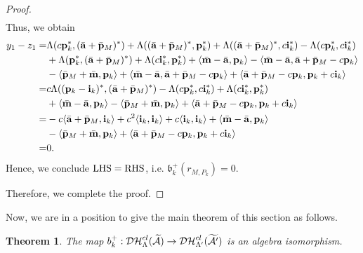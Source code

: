 \documentclass[reqno,12pt]{amsart}
\numberwithin{equation}{section}
\def\lr#1{\langle #1\rangle} \def\fin{\hfill$\square$}  \def\lra{\longrightarrow} \def\mod{\mbox{\rm \textbf{mod}}\,}\def\Mod{\mbox{\rm mod}\,}\def\top{\mbox{\rm top}\,}\def\soc{\mbox{\rm soc}\,}
\theoremstyle{plain} %
\newtheorem{theorem}{\bf Theorem}[section]
\theoremstyle{definition} %
\begin{document}
\begin{proof}
\begin{align*}
\end{align*}
Thus, we obtain
\begin{align*}
y_1-z_1=&\Lambda(c{\bf p}_k^\ast,(\bar{{\bf a}}+\bar{{\bf p}}_M)^\ast)+\Lambda((\bar{{\bf a}}+\bar{{\bf p}}_M)^\ast,{\bf p}_k^\ast)+\Lambda((\bar{{\bf a}}+\bar{{\bf p}}_M)^\ast,c{\bf i}_k^\ast)-\Lambda(c{\bf p}_k^\ast,c{\bf i}_k^\ast)\\&+\Lambda({\bf p}_k^\ast,(\bar{{\bf a}}+\bar{{\bf p}}_M)^\ast)+\Lambda(c{\bf i}_k^\ast,{\bf p}_k^\ast)+\lr{\bar{{\bf m}}-\bar{{\bf a}},{\bf p}_k}-\lr{\bar{{\bf m}}-\bar{{\bf a}},\bar{{\bf a}}+\bar{{\bf p}}_M-c{\bf p}_k}\\&-\lr{{\bar{\bf p}}_M+{\bar{\bf m}},{\bf p}_k}+\lr{\bar{{\bf m}}-\bar{{\bf a}},{\bar{{\bf a}}}+{\bar{{\bf p}}}_M-c{{\bf p}_k}}+\lr{{\bar{{\bf a}}}+{\bar{{\bf p}}}_M-c{{\bf p}_k},{\bf p}_k+c{\bf i}_k}\\
=&c\Lambda(({\bf p}_k-{\bf i}_k)^\ast,(\bar{{\bf a}}+\bar{{\bf p}}_M)^\ast)-\Lambda(c{\bf p}_k^\ast,c{\bf i}_k^\ast)+\Lambda(c{\bf i}_k^\ast,{\bf p}_k^\ast)\\&+\lr{\bar{{\bf m}}-\bar{{\bf a}},{\bf p}_k}-\lr{{\bar{\bf p}}_M+{\bar{\bf m}},{\bf p}_k}+\lr{{\bar{{\bf a}}}+{\bar{{\bf p}}}_M-c{{\bf p}_k},{\bf p}_k+c{\bf i}_k}\\
=&-c\lr{\bar{{\bf a}}+\bar{{\bf p}}_M,{\bf i}_k}+c^2\lr{{\bf i}_k,{\bf i}_k}+c\lr{{\bf i}_k,{\bf i}_k}+\lr{\bar{{\bf m}}-\bar{{\bf a}},{\bf p}_k}\\&-\lr{{\bar{\bf p}}_M+{\bar{\bf m}},{\bf p}_k}+\lr{{\bar{{\bf a}}}+{\bar{{\bf p}}}_M-c{{\bf p}_k},{\bf p}_k+c{\bf i}_k}\\
=&0.
\end{align*}
Hence, we conclude ${\rm LHS}={\rm RHS}$, i.e. $\mathfrak{b}_k^+(r_{M,P_k})=0$.

Therefore, we complete the proof.
\end{proof}
Now, we are in a position to give the main theorem of this section as follows.
\begin{theorem}\label{mutationbubian}
The map $b_k^+:\mathcal{DH}_{\Lambda}^{cl}(\widetilde{\mathcal{A}})\to \mathcal{DH}_{\Lambda'}^{cl}(\widetilde{\mathcal{A}'})$ is an algebra isomorphism.
\end{theorem}
\end{document}
